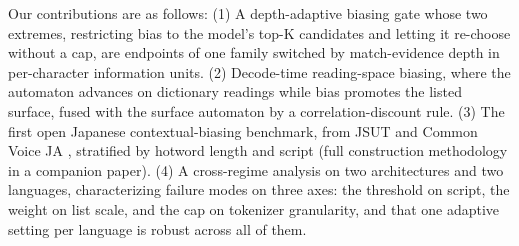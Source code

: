 \documentclass{article}
\begin{document}

Our contributions are as follows: (1) A depth-adaptive biasing gate whose two extremes, restricting bias to the model's top-K candidates and letting it re-choose without a cap, are endpoints of one family switched by match-evidence depth in per-character information units. (2) Decode-time reading-space biasing, where the automaton advances on dictionary readings while bias promotes the listed surface, fused with the surface automaton by a correlation-discount rule. (3) The first open Japanese contextual-biasing benchmark, from JSUT \cite{sonobe2017jsut} and Common Voice JA \cite{ardila2020common}, stratified by hotword length and script (full construction methodology in a companion paper). (4) A cross-regime analysis on two architectures \cite{an2024funaudiollm,peng24b_interspeech} and two languages, characterizing failure modes on three axes: the threshold on script, the weight on list scale, and the cap on tokenizer granularity, and that one adaptive setting per language is robust across all of them.
\end{document}
